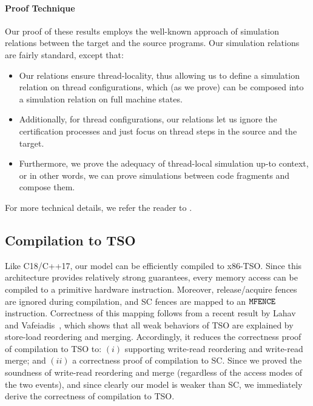 
\paragraph{Proof Technique}

Our proof of these results employs the well-known approach of simulation relations between the
target and the source programs.  Our simulation relations are fairly standard, except that:
%
\begin{itemize}
\item Our relations ensure thread-locality, thus allowing us to define a simulation relation on
  thread configurations, which (as we prove) can be composed into a simulation relation on full
  machine states.

\item Additionally, for thread configurations, our relations let us ignore the certification
  processes and just focus on thread steps in the source and the target.

\item Furthermore, we prove the adequacy of thread-local simulation up-to context, or in other
  words, we can prove simulations between code fragments and compose them.
\end{itemize}
%
\noindent For more technical details, we refer the reader to .



\subsection{Compilation to TSO}
\label{sec:compilation_TSO}

Like C18/C++17, our model can be efficiently compiled to x86-TSO.
Since this architecture provides relatively strong guarantees,
every memory access can be compiled to a primitive hardware instruction.
Moreover, release/acquire fences are ignored during compilation,
and SC fences are mapped to an $\texttt{MFENCE}$ instruction.
Correctness of this mapping follows from a recent result by Lahav and Vafeiadis~\cite{fm16},
which shows that all weak behaviors of TSO are explained by store-load reordering and merging.
Accordingly, it reduces the correctness proof of compilation to TSO to:
$(i)$ supporting write-read reordering and write-read merge;
and $(ii)$ a correctness proof of compilation to SC.
Since we proved the soundness of write-read reordering and merge 
(regardless of the access modes of the two events),
and since clearly our model is weaker than SC,
we immediately derive the correctness of compilation to TSO.

